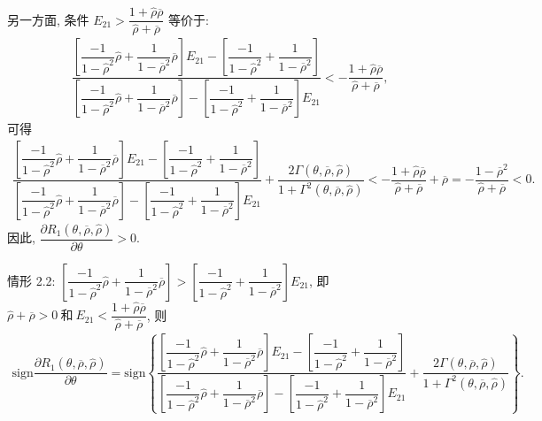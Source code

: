 \documentclass[10.0pt]{article}
\begin{document}
另一方面, 条件 {\footnotesize $ E_{2 1} > \dfrac{1 + {\hat \rho} \overline{\rho}}{{\hat \rho} + \overline{\rho}} $} 等价于:
{\footnotesize \begin{eqnarray*}
\dfrac{\left[ \dfrac{- 1}{1 - {\hat \rho}^2} {\hat \rho} + \dfrac1{1 - \overline{\rho}^2} \overline{\rho} \right] E_{2 1} - \left[ \dfrac{- 1}{1 - {\hat \rho}^2} + \dfrac1{1 - \overline{\rho}^2} \right]}{\left[ \dfrac{- 1}{1 - {\hat \rho}^2} {\hat \rho} + \dfrac1{1 - \overline{\rho}^2} \overline{\rho} \right] - \left[ \dfrac{- 1}{1 - {\hat \rho}^2} + \dfrac1{1 - \overline{\rho}^2} \right] E_{2 1}} < - \dfrac{1 + {\hat \rho} \overline{\rho}}{{\hat \rho} + \overline{\rho}},
\end{eqnarray*}}
可得
{\footnotesize \begin{eqnarray*}
\dfrac{\left[ \dfrac{- 1}{1 - {\hat \rho}^2} {\hat \rho} + \dfrac1{1 - \overline{\rho}^2} \overline{\rho} \right] E_{2 1} - \left[ \dfrac{- 1}{1 - {\hat \rho}^2} + \dfrac1{1 - \overline{\rho}^2} \right]}{\left[ \dfrac{- 1}{1 - {\hat \rho}^2} {\hat \rho} + \dfrac1{1 - \overline{\rho}^2} \overline{\rho} \right] - \left[ \dfrac{- 1}{1 - {\hat \rho}^2} + \dfrac1{1 - \overline{\rho}^2} \right] E_{2 1}} + \dfrac{2 \Gamma (\theta, \overline{\rho}, {\hat \rho})}{1 + \Gamma^2 (\theta, \overline{\rho}, {\hat \rho})} < - \dfrac{1 + {\hat \rho} \overline{\rho}}{{\hat \rho} + \overline{\rho}}  + \overline{\rho} = - \dfrac{1 - \overline{\rho}^2}{{\hat \rho} + \overline{\rho}} < 0.
\end{eqnarray*}}
因此, {\footnotesize $ \dfrac{\partial R_1 (\theta, \overline{\rho}, {\hat \rho})}{\partial \theta} > 0 $}.

情形 2.2: {\footnotesize $ \left[ \dfrac{- 1}{1 - {\hat \rho}^2} {\hat \rho} + \dfrac1{1 - \overline{\rho}^2} \overline{\rho} \right] > \left[ \dfrac{- 1}{1 - {\hat \rho}^2} + \dfrac1{1 - \overline{\rho}^2} \right] E_{2 1} $}, 即 {\footnotesize $ {\hat \rho} + \overline{\rho} > 0 \ \text{和} \ E_{2 1} < \dfrac{1 + {\hat \rho} \overline{\rho}}{{\hat \rho} + \overline{\rho}} $}, 则
{\footnotesize \begin{eqnarray*}
\text{sign} \dfrac{\partial R_1 (\theta, \overline{\rho}, {\hat \rho})}{\partial \theta} = \text{sign} \left\{ \dfrac{\left[ \dfrac{- 1}{1 - {\hat \rho}^2} {\hat \rho} + \dfrac1{1 - \overline{\rho}^2} \overline{\rho} \right] E_{2 1} - \left[ \dfrac{- 1}{1 - {\hat \rho}^2} + \dfrac1{1 - \overline{\rho}^2} \right]}{\left[ \dfrac{- 1}{1 - {\hat \rho}^2} {\hat \rho} + \dfrac1{1 - \overline{\rho}^2} \overline{\rho} \right] - \left[ \dfrac{- 1}{1 - {\hat \rho}^2} + \dfrac1{1 - \overline{\rho}^2} \right] E_{2 1}} + \dfrac{2 \Gamma (\theta, \overline{\rho}, {\hat \rho})}{1 + \Gamma^2 (\theta, \overline{\rho}, {\hat \rho})} \right\}.
\end{eqnarray*}}
\end{document}
